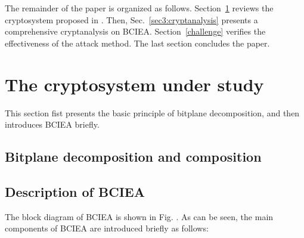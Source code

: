 \documentclass[final,3p,times,twocolumn]{elsarticle}
\begin{document}
%	
%	
%	
%

The remainder of the paper is organized as follows. Section~\ref{sec2:BCIEA} reviews the cryptosystem proposed in \cite{ESSAID2019jisa}. Then, Sec.~\ref{sec3:cryptanalysis} presents a comprehensive cryptanalysis on BCIEA. Section~\ref{challenge} verifies the effectiveness of the attack method. The last section concludes the paper.

\section{The cryptosystem under study}
\label{sec2:BCIEA}

This section fist presents the basic principle of bitplane decomposition, and then introduces BCIEA briefly.
\subsection{Bitplane decomposition and composition}


\subsection{Description of BCIEA}

The block diagram of BCIEA is shown in Fig. . As can be seen, the main components of BCIEA are introduced briefly as follows:

\end{document}

